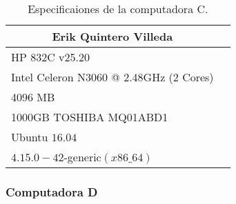 \documentclass[12pt, letterpaper]{article}
\begin{document}
                                \begin{table}[htb]
                                        \centering
                                        \begin{tabular}{|l|l|}
                                        \hline
                                                \multicolumn{1}{|c|}{Erik Quintero Villeda} \\ 
                                                \hline \hline
                                                HP 832C v25.20  \\
                                                Intel Celeron N3060 @ 2.48GHz (2 Cores) \\ 
                                                4096 MB \\ 
                                                1000GB TOSHIBA MQ01ABD1 \\
                                                Ubuntu $16.04$ \\ 
                                                $4.15.0-42$-generic$(x86\_64)$ \\ 
                                                \hline
                                        \end{tabular}
                                        \caption{Especificaiones de la computadora C.}
                                \end{table}\vspace{2cm}

                        \subsubsection*{Computadora D}
\end{document}
